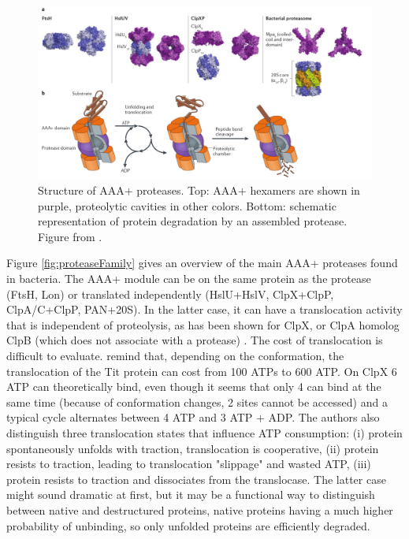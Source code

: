 \begin{figure}[!ht]
	\centering
	\includegraphics[width=0.8\linewidth]{figure/proteaseStructure}
	\caption{Structure of AAA+ proteases. Top: AAA+ hexamers are shown in purple, proteolytic cavities in other colors. Bottom: schematic representation of protein degradation by an assembled protease. Figure from \citet{gur_regulated_2011}.}
	\label{fig:proteaseStructure}	
\end{figure}

Figure \ref{fig:proteaseFamily} gives an overview of the main AAA+ proteases found in bacteria. The AAA+ module can be on the same protein as the protease (FtsH, Lon) or translated independently (HslU+HslV, ClpX+ClpP, ClpA/C+ClpP, PAN+20S). In the latter case, it can have a translocation activity that is independent of proteolysis, as has been shown for ClpX, or ClpA homolog ClpB (which does not associate with a protease) \citep{sauer_aaa+_2011}. The cost of translocation is difficult to evaluate. \citet{sauer_aaa+_2011} remind that, depending on the conformation, the translocation of the Tit protein can cost from 100 ATPs to 600 ATP. On ClpX 6 ATP can theoretically bind, even though it seems that only 4 can bind at the same time (because of conformation changes, 2 sites cannot be accessed) and a typical cycle alternates between 4 ATP and 3 ATP + ADP. The authors also distinguish three translocation states that influence ATP consumption: (i) protein spontaneously unfolds with traction, translocation is cooperative, (ii) protein resists to traction, leading to translocation "slippage" and wasted ATP, (iii) protein resists to traction and dissociates from the translocase. The latter case might sound dramatic at first, but it may be a functional way to distinguish between native and destructured proteins, native proteins having a much higher probability of unbinding, so only unfolded proteins are efficiently degraded.

